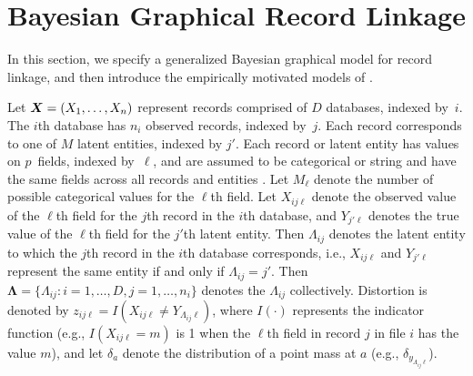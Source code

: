 \documentclass[11pt]{article}\usepackage[]{graphicx}\usepackage[]{color}
\begin{document}
\section{Bayesian Graphical Record Linkage}
\label{sec:bayes}
In this section, we specify a generalized Bayesian graphical model for record linkage, and then introduce the empirically motivated models of \citep{steorts15entity}. 


Let $\bm{X}=(X_1,\ldots,X_n)$ represent records comprised of $D$ databases, indexed by~$i$.  The $i$th database has $n_i$ observed records, indexed by~$j$. Each record corresponds to one of $M$ latent entities, indexed by $j'$. Each record or latent entity has values on $p$~fields, indexed by~$\ell$, and are assumed to be categorical or string and have the same fields across all records and entities \cite{steorts14smered,steorts??bayesian}. Let $M_\ell$ denote the number of possible categorical values for the $\ell$th field. Let $X_{ij\ell}$ denote the observed value of the $\ell$th field for the $j$th record in the $i$th database, and $Y_{j'\ell}$ denotes the true value of the $\ell$th field for the $j'$th latent entity. Then $\Lambda_{ij}$ denotes the latent entity to which the $j$th record in the $i$th database corresponds, i.e., $X_{ij\ell}$ and $Y_{j'\ell}$ represent the same entity if and only if $\Lambda_{ij}=j'$.
%
Then $\bm\Lambda = \{\Lambda_{ij}: i = 1, \dots, D, j = 1, \dots, n_i\}$ denotes the $\Lambda_{ij}$ collectively. Distortion is denoted by $z_{ij\ell}=I(X_{ij\ell}\ne Y_{\Lambda_{ij}\ell})$, where $I(\cdot)$ represents the indicator function (e.g., $I(X_{ij\ell}=m)$ is 1 when the $\ell$th field in record $j$ in file $i$ has the value $m$), and let $\delta_a$ denote the distribution of a point mass at $a$ (e.g., $\delta_{y_{\Lambda_{ij}\ell}}$).
\end{document}
